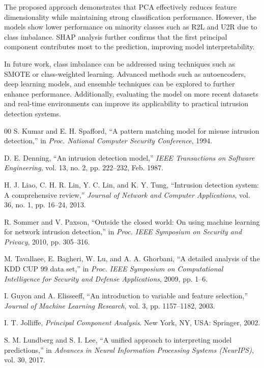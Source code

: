 \documentclass[conference]{IEEEtran}
\begin{document}
The proposed approach demonstrates that PCA effectively reduces feature dimensionality while maintaining strong classification performance. However, the models show lower performance on minority classes such as R2L and U2R due to class imbalance. SHAP analysis further confirms that the first principal component contributes most to the prediction, improving model interpretability.

In future work, class imbalance can be addressed using techniques such as SMOTE or class-weighted learning. Advanced methods such as autoencoders, deep learning models, and ensemble techniques can be explored to further enhance performance. Additionally, evaluating the model on more recent datasets and real-time environments can improve its applicability to practical intrusion detection systems.


\begin{thebibliography}{00}
 S. Kumar and E. H. Spafford, ``A pattern matching model for misuse intrusion detection,'' in \textit{Proc. National Computer Security Conference}, 1994.

 D. E. Denning, ``An intrusion detection model,'' \textit{IEEE Transactions on Software Engineering}, vol. 13, no. 2, pp. 222--232, Feb. 1987.

 H. J. Liao, C. H. R. Lin, Y. C. Lin, and K. Y. Tung, ``Intrusion detection system: A comprehensive review,'' \textit{Journal of Network and Computer Applications}, vol. 36, no. 1, pp. 16--24, 2013.

 R. Sommer and V. Paxson, ``Outside the closed world: On using machine learning for network intrusion detection,'' in \textit{Proc. IEEE Symposium on Security and Privacy}, 2010, pp. 305--316.

 M. Tavallaee, E. Bagheri, W. Lu, and A. A. Ghorbani, ``A detailed analysis of the KDD CUP 99 data set,'' in \textit{Proc. IEEE Symposium on Computational Intelligence for Security and Defense Applications}, 2009, pp. 1--6.

 I. Guyon and A. Elisseeff, ``An introduction to variable and feature selection,'' \textit{Journal of Machine Learning Research}, vol. 3, pp. 1157--1182, 2003.

 I. T. Jolliffe, \textit{Principal Component Analysis}. New York, NY, USA: Springer, 2002.

 S. M. Lundberg and S. I. Lee, ``A unified approach to interpreting model predictions,'' in \textit{Advances in Neural Information Processing Systems (NeurIPS)}, vol. 30, 2017.


\end{thebibliography}
\end{document}
